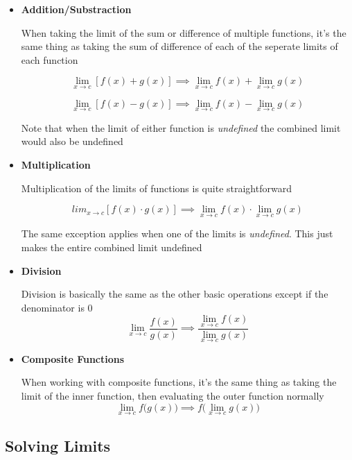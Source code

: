 \documentclass[12pt]{article}
\newcommand{\uit}[1]{\textit{#1}}
\begin{document}
    \begin{itemize}
        
        \item \textbf{Addition/Substraction}
        
        When taking the limit of the sum or difference of multiple functions, it's the 
        same thing as taking the sum of difference of each of the seperate limits of each function
        
        \[
            \lim_{x \to c} [f(x) + g(x)] \implies \lim_{x \to c} f(x) + \lim_{x \to c} g(x)   
        \]

        \[
            \lim_{x \to c} [f(x) - g(x)] \implies \lim_{x \to c} f(x) - \lim_{x \to c} g(x)
        \]

        Note that when the limit of either function is \uit{undefined} the combined
        limit would also be undefined

        \item \textbf{Multiplication}
        
        Multiplication of the limits of functions is quite straightforward
        
        \[
            lim_{x \to c} [f(x) \cdot g(x)] \implies \lim_{x \to c} f(x) \cdot \lim_{x \to c} g(x)    
        \]

        The same exception applies when one of the limits is \uit{undefined}. This just makes
        the entire combined limit undefined

        \item \textbf{Division}
        
        Division is basically the same as the other basic operations except if the denominator is 0
        \[
            \lim_{x \to c} \frac{f(x)}{g(x)} \implies \frac{\lim_{x \to c} f(x)}{\lim_{x \to c} g(x)}   
        \]

        \item \textbf{Composite Functions}
        
        When working with composite functions, it's the same thing as taking
        the limit of the inner function, then evaluating the outer function normally
        \[
            \lim_{x \to c} f\bigg(g(x)\bigg) \implies f\bigg(\lim_{x \to c} g(x)\bigg)    
        \]

    \end{itemize}

    \subsection{Solving Limits}
\end{document}
